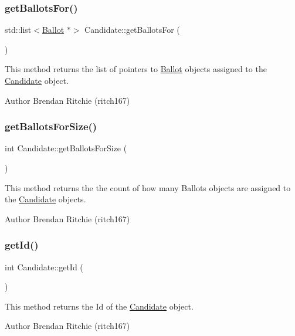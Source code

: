 \subsubsection{\texorpdfstring{get\+Ballots\+For()}{getBallotsFor()}}
{\footnotesize\ttfamily std\+::list$<$\hyperlink{classBallot}{Ballot} $\ast$$>$ Candidate\+::get\+Ballots\+For (\begin{DoxyParamCaption}{ }\end{DoxyParamCaption})}

This method returns the list of pointers to \hyperlink{classBallot}{Ballot} objects assigned to the \hyperlink{classCandidate}{Candidate} object. \begin{DoxyAuthor}{Author}
Brendan Ritchie (ritch167) 
\end{DoxyAuthor}
\mbox{\label{classCandidate_abe5eb062e31ef3602b4434e5e9f1e596}} 
\subsubsection{\texorpdfstring{get\+Ballots\+For\+Size()}{getBallotsForSize()}}
{\footnotesize\ttfamily int Candidate\+::get\+Ballots\+For\+Size (\begin{DoxyParamCaption}{ }\end{DoxyParamCaption})}

This method returns the the count of how many Ballots objects are assigned to the \hyperlink{classCandidate}{Candidate} objects. \begin{DoxyAuthor}{Author}
Brendan Ritchie (ritch167) 
\end{DoxyAuthor}
\mbox{\label{classCandidate_a50e7cd31dc68665860932987ad2ffea6}} 
\subsubsection{\texorpdfstring{get\+Id()}{getId()}}
{\footnotesize\ttfamily int Candidate\+::get\+Id (\begin{DoxyParamCaption}{ }\end{DoxyParamCaption})}

This method returns the Id of the \hyperlink{classCandidate}{Candidate} object. \begin{DoxyAuthor}{Author}
Brendan Ritchie (ritch167) 
\end{DoxyAuthor}
\mbox{\label{classCandidate_af862d92e21d66d74f1d5cae92937d3da}} 
